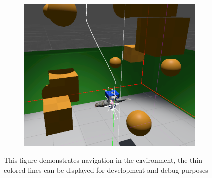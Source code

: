 \begin{figure}
\begin{subfigure}[t]{0.33\textwidth}
\end{subfigure}%
    \hfill
\begin{subfigure}[t]{0.33\textwidth}
\centering
\includegraphics[width=\linewidth]{figures/simulation/editor-back}
\end{subfigure}
\caption{This figure demonstrates navigation in the environment, the thin colored lines can be displayed for development and debug purposes}
\end{figure}

